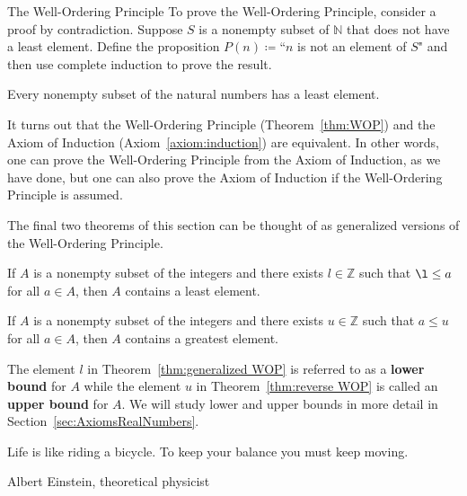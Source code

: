 \begin{section}{The Well-Ordering Principle}
To prove the Well-Ordering Principle, consider a proof by contradiction. Suppose $S$ is a nonempty subset of $\mathbb{N}$ that does not have a least element.  Define the proposition $P(n)\coloneqq $``$n$ is not an element of $S$" and then use complete induction to prove the result.

\begin{theorem}\label{thm:WOP}
Every nonempty subset of the natural numbers has a least element.
\end{theorem}

It turns out that the Well-Ordering Principle (Theorem~\ref{thm:WOP}) and the Axiom of Induction (Axiom~\ref{axiom:induction}) are equivalent.  In other words, one can prove the Well-Ordering Principle from the Axiom of Induction, as we have done, but one can also prove the Axiom of Induction if the Well-Ordering Principle is assumed.

The final two theorems of this section can be thought of as generalized versions of the Well-Ordering Principle.

\begin{theorem}\label{thm:generalized WOP}
If $A$ is a nonempty subset of the integers and there exists $l\in \mathbb{Z}$ such that $\l\leq a$ for all $a\in A$, then $A$ contains a least element.
\end{theorem}

\begin{theorem}\label{thm:reverse WOP}
If $A$ is a nonempty subset of the integers and there exists $u\in \mathbb{Z}$ such that $a\leq u$ for all $a\in A$, then $A$ contains a greatest element.
\end{theorem}

The element $l$ in Theorem~\ref{thm:generalized WOP} is referred to as a \textbf{lower bound} for $A$ while the element $u$ in Theorem~\ref{thm:reverse WOP} is called an \textbf{upper bound} for $A$. We will study lower and upper bounds in more detail in Section~\ref{sec:AxiomsRealNumbers}.

\epigraph{Life is like riding a bicycle. To keep your balance you must keep moving.}{Albert Einstein, theoretical physicist}

\end{section}